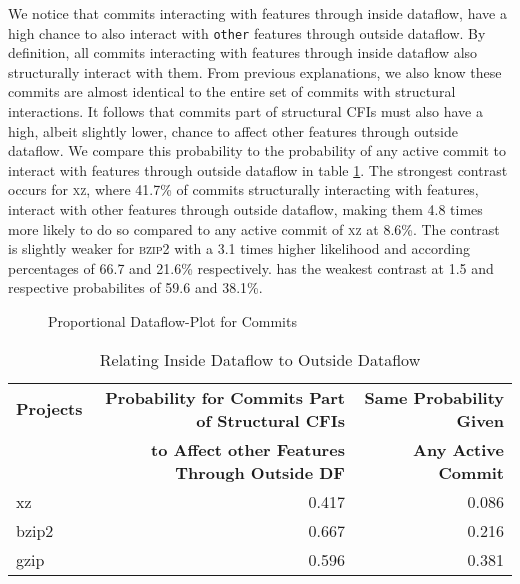 \iffalse
We admit that the high proportions of commits with both inside and outside dataflow are rather unexpected.
They hinder a clear separation of commits with dataflow interactions into less and more interesting commits, e.g. commits whose dataflow interactions are more and less obvious.
\fi
We notice that commits interacting with features through inside dataflow, have a high chance to also interact with \texttt{other} features through outside dataflow.
By definition, all commits interacting with features through inside dataflow also structurally interact with them.
From previous explanations, we also know these commits are almost identical to the entire set of commits with structural interactions.
It follows that commits part of structural CFIs must also have a high, albeit slightly lower, chance to affect other features through outside dataflow.
We compare this probability to the probability of any active commit to interact with features through outside dataflow in table \ref{tab:commit_dfbr_rel_table}.
The strongest contrast occurs for \textsc{xz}, where 41.7\% of commits structurally interacting with features, interact with other features through outside dataflow, making them 4.8 times more likely to do so compared to any active commit of \textsc{xz} at 8.6\%.
The contrast is slightly weaker for \textsc{bzip2} with a 3.1 times higher likelihood and according percentages of 66.7 and 21.6\% respectively. 
 has the weakest contrast at 1.5 and respective probabilites of 59.6 and 38.1\%. 

\begin{figure}[htbp]
  \centering
  
  \caption{Proportional Dataflow-Plot for Commits}
  \label{fig:commit_dfbr_plot}
\end{figure}

\begin{table}[t]
\caption{Relating Inside Dataflow to Outside Dataflow}
\label{tab:commit_dfbr_rel_table}
\centering
\begin{tabular}{l r r}
\toprule
\textbf{Projects} & \textbf{Probability for Commits Part of Structural CFIs} & \textbf{Same Probability Given} \\ 
 		  & \textbf{to Affect other Features Through Outside DF}     & \textbf{Any Active Commit} \\
\midrule
  xz    & 0.417 & 0.086 \\
  bzip2 & 0.667 & 0.216 \\
  gzip  & 0.596 & 0.381 \\
\bottomrule
\end{tabular}
\end{table}

